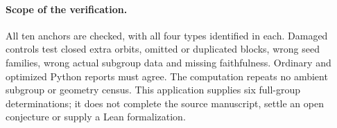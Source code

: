 \documentclass[11pt]{article}
\begin{document}
\paragraph{Scope of the verification.}
All ten anchors are checked, with all four types identified in each.
Damaged controls test closed extra orbits, omitted or duplicated blocks,
wrong seed families, wrong actual subgroup data and missing faithfulness.
Ordinary and optimized Python reports must agree. The computation repeats
no ambient subgroup or geometry census. This application supplies six
full-group determinations; it does not complete the source manuscript,
settle an open conjecture or supply a Lean formalization.
\end{document}
